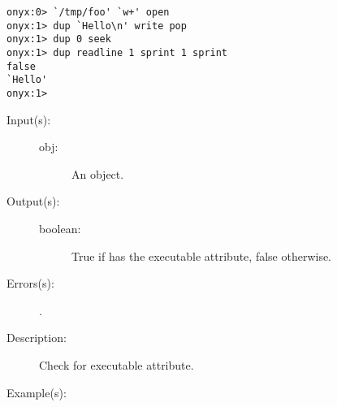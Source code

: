 \begin{description}
\begin{description}
\begin{verbatim}
onyx:0> `/tmp/foo' `w+' open
onyx:1> dup `Hello\n' write pop
onyx:1> dup 0 seek
onyx:1> dup readline 1 sprint 1 sprint
false
`Hello'
onyx:1>
		\end{verbatim}
	\end{description}
\label{systemdict:xcheck}
\item[{\onyxop{obj}{xcheck}{boolean}}: ]
	\begin{description}\item[]
	\item[Input(s): ]
		\begin{description}\item[]
		\item[obj: ]
			An object.
		\end{description}
	\item[Output(s): ]
		\begin{description}\item[]
		\item[boolean: ]
			True if  has the executable attribute, false
			otherwise.
		\end{description}
	\item[Errors(s): ]
		\begin{description}\item[]
		\item[.]
		\end{description}
	\item[Description: ]
		Check  for executable attribute.
	\item[Example(s): ]\begin{verbatim}


\end{verbatim}
\end{description}
\end{description}
